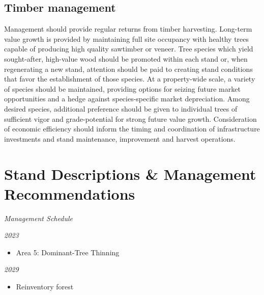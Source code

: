 \documentclass[]{tufte-handout}
\begin{document}
\subsection{Timber management}\label{timber-management}

Management should provide regular returns from timber harvesting.
Long-term value growth is provided by maintaining full site occupancy
with healthy trees capable of producing high quality sawtimber or
veneer. Tree species which yield sought-after, high-value wood should be
promoted within each stand or, when regenerating a new stand, attention
should be paid to creating stand conditions that favor the establishment
of those species. At a property-wide scale, a variety of species should
be maintained, providing options for seizing future market opportunities
and a hedge against species-specific market depreciation. Among desired
species, additional preference should be given to individual trees of
sufficient vigor and grade-potential for strong future value growth.
Consideration of economic efficiency should inform the timing and
coordination of infrastructure investments and stand maintenance,
improvement and harvest operations.

\section{Stand Descriptions \& Management
Recommendations}\label{stand-descriptions-management-recommendations}

\begin{marginfigure} \noindent \textit{\LARGE Management Schedule} 

 \vspace{10 pt} 

 \noindent \textit{\large 2023} 

 \begin{itemize} \item Area 5: Dominant-Tree Thinning 

 \end{itemize} \vspace{10 pt} 

 \noindent \textit{\large 2029} 

 \begin{itemize} \item Reinventory forest 

 \end{itemize} \end{marginfigure}
\end{document}

